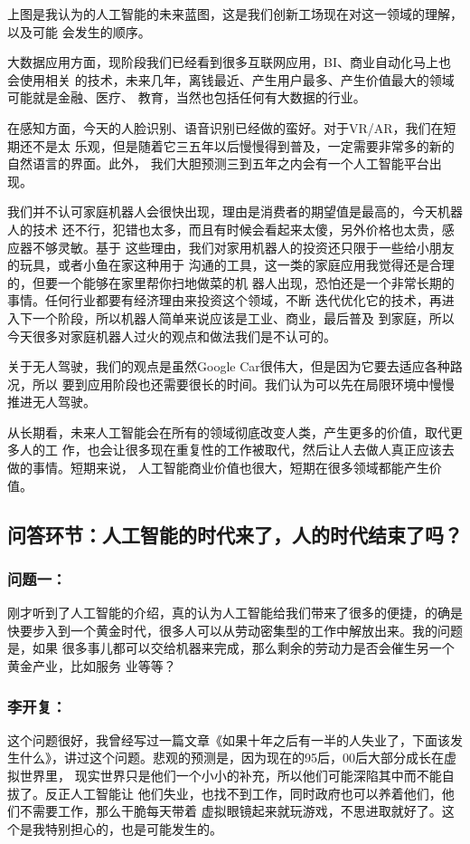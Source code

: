 \documentclass[11pt]{ctexart}
\begin{document}
{{{{上图是我认为的人工智能的未来蓝图，这是我们创新工场现在对这一领域的理解，以及可能
会发生的顺序。

大数据应用方面，现阶段我们已经看到很多互联网应用，BI、商业自动化马上也会使用相关
的技术，未来几年，离钱最近、产生用户最多、产生价值最大的领域可能就是金融、医疗、
教育，当然也包括任何有大数据的行业。

在感知方面，今天的人脸识别、语音识别已经做的蛮好。对于VR/AR，我们在短期还不是太
乐观，但是随着它三五年以后慢慢得到普及，一定需要非常多的新的自然语言的界面。此外，
我们大胆预测三到五年之内会有一个人工智能平台出现。

我们并不认可家庭机器人会很快出现，理由是消费者的期望值是最高的，今天机器人的技术
还不行，犯错也太多，而且有时候会看起来太傻，另外价格也太贵，感应器不够灵敏。基于
这些理由，我们对家用机器人的投资还只限于一些给小朋友的玩具，或者小鱼在家这种用于
沟通的工具，这一类的家庭应用我觉得还是合理的，但要一个能够在家里帮你扫地做菜的机
器人出现，恐怕还是一个非常长期的事情。任何行业都要有经济理由来投资这个领域，不断
迭代优化它的技术，再进入下一个阶段，所以机器人简单来说应该是工业、商业，最后普及
到家庭，所以今天很多对家庭机器人过火的观点和做法我们是不认可的。

关于无人驾驶，我们的观点是虽然Google Car很伟大，但是因为它要去适应各种路况，所以
要到应用阶段也还需要很长的时间。我们认为可以先在局限环境中慢慢推进无人驾驶。

从长期看，未来人工智能会在所有的领域彻底改变人类，产生更多的价值，取代更多人的工
作，也会让很多现在重复性的工作被取代，然后让人去做人真正应该去做的事情。短期来说，
人工智能商业价值也很大，短期在很多领域都能产生价值。

\subsection{问答环节：人工智能的时代来了，人的时代结束了吗？}
\label{sec:org7444b6c}

\subsubsection{问题一：}
\label{sec:org4718ea7}
刚才听到了人工智能的介绍，真的认为人工智能给我们带来了很多的便捷，的确是
快要步入到一个黄金时代，很多人可以从劳动密集型的工作中解放出来。我的问题是，如果
很多事儿都可以交给机器来完成，那么剩余的劳动力是否会催生另一个黄金产业，比如服务
业等等？

\subsubsection{李开复：}
\label{sec:orgb5557f7}
这个问题很好，我曾经写过一篇文章《如果十年之后有一半的人失业了，下面该发
生什么》，讲过这个问题。悲观的预测是，因为现在的95后，00后大部分成长在虚拟世界里，
现实世界只是他们一个小小的补充，所以他们可能深陷其中而不能自拔了。反正人工智能让
他们失业，也找不到工作，同时政府也可以养着他们，他们不需要工作，那么干脆每天带着
虚拟眼镜起来就玩游戏，不思进取就好了。这个是我特别担心的，也是可能发生的。

}}}}
\end{document}
